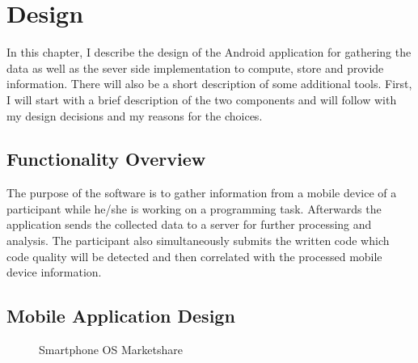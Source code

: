 \chapter{Design}

\begin{flushleft}
In this chapter, I describe the design of the Android application for gathering the data as well as the sever side implementation to compute, store and provide information. There will also be a short description of some additional tools. 
First, I will start with a brief description of the two components and will follow with my design decisions and my reasons for the choices. 
\end{flushleft}

\section{Functionality Overview}
The purpose of the software is to gather information from a mobile device of a participant while he/she is working on a programming task. Afterwards the application sends the collected data to a server for further processing and analysis. The participant also simultaneously submits the written code which code quality will be detected and then correlated with the processed mobile device information. 

\section{Mobile Application Design}


\begin{figure}
	\centering
 	\caption{Smartphone OS Marketshare}\label{result}
 	\vspace{10 mm}
\end{figure}

